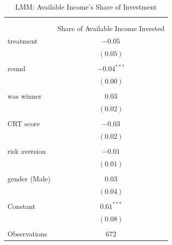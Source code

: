 \begin{appendices}
\begin{table}
\begin{center}
\caption{LMM: Available Income's Share of Investment}
\label{ax:available_share}
\begin{tabular}{l c }
\\[-1.8ex]\hline 
\hline \\[-1.8ex] 
\\[-1.8ex] & Share of Available Income Invested\\
\hline
treatment                                  & $-0.05$       \\
                                           & $(0.05)$      \\
                                             &  \\ 
round                                      & $-0.04^{***}$ \\
                                           & $(0.00)$      \\
                                            &  \\ 
was winner                                & $0.03$        \\
                                           & $(0.02)$      \\
                                             &  \\ 
CRT score                                 & $-0.03$       \\
                                           & $(0.02)$      \\
                                             &  \\ 
risk aversion                             & $-0.01$       \\
                                           & $(0.01)$      \\
                                             &  \\ 
gender (Male)                                 & $0.03$        \\
                                           & $(0.04)$      \\
                                             &  \\ 
Constant                                & $0.61^{***}$  \\
                                           & $(0.08)$      \\
                                             &  \\ 
\hline
Observations                                  & $672$           \\

\end{tabular}
\end{center}
\end{table}
\end{appendices}
